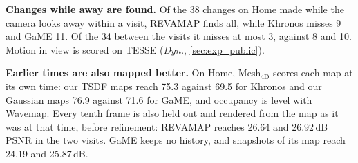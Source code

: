 \documentclass[10pt,twocolumn,letterpaper]{article}
\newcommand{\ours}{REVAMAP\xspace}
\begin{document}
%

\noindent\textbf{Changes while away are found.}
Of the 38 changes on Home made while the camera looks away within a visit, \ours finds all, while Khronos misses 9 and GaME 11. Of the 34 between the visits it misses at most 3, against 8 and 10. Motion in view is scored on TESSE (\emph{Dyn.}, \cref{sec:exp_public}).

\noindent\textbf{Earlier times are also mapped better.}
On Home, Mesh$_{\mathrm{4D}}$ scores each map at its own time: our TSDF maps reach 75.3 against 69.5 for Khronos and our Gaussian maps 76.9 against 71.6 for GaME, and occupancy is level with Wavemap. Every tenth frame is also held out and rendered from the map as it was at that time, before refinement: \ours reaches 26.64 and 26.92\,dB PSNR in the two visits. GaME keeps no history, and snapshots of its map reach 24.19 and 25.87\,dB.
\end{document}
